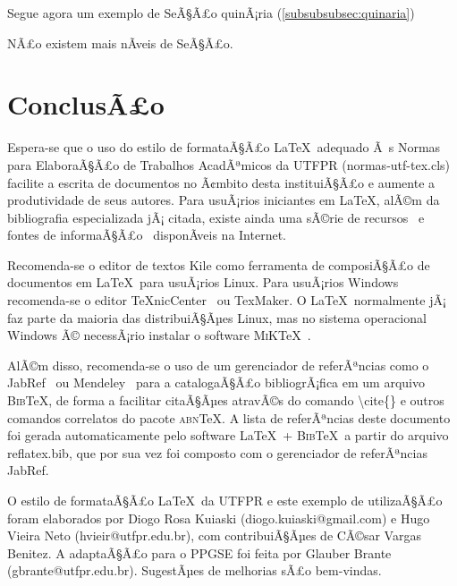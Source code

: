 \documentclass[openright]{normas-utf-tex} %
\begin{document}
Segue agora um exemplo de SeÃ§Ã£o quinÃ¡ria (\ref{subsubsubsec:quinaria})

\label{subsubsubsec:quinaria}

NÃ£o existem mais nÃ­veis de SeÃ§Ã£o.

\chapter{ConclusÃ£o}
\label{chap:conclusao}

Espera-se que o uso do estilo de formataÃ§Ã£o \LaTeX\ adequado Ã s Normas para ElaboraÃ§Ã£o de Trabalhos AcadÃªmicos da UTFPR ({\ttfamily normas-utf-tex.cls}) facilite a escrita de documentos no Ã¢mbito desta instituiÃ§Ã£o e aumente a produtividade de seus autores. Para usuÃ¡rios iniciantes em \LaTeX, alÃ©m da bibliografia especializada jÃ¡ citada, existe ainda uma sÃ©rie de recursos~\cite{CTAN2009} e fontes de informaÃ§Ã£o~\cite{TeX-Br2009,Wikibooks2009} disponÃ­veis na Internet.

Recomenda-se o editor de textos Kile como ferramenta de composiÃ§Ã£o de documentos em \LaTeX\ para usuÃ¡rios Linux. Para usuÃ¡rios Windows recomenda-se o editor \TeX nicCenter~\cite{TeXnicCenter2009} ou TexMaker. O \LaTeX\ normalmente jÃ¡ faz parte da maioria das distribuiÃ§Ãµes Linux, mas no sistema operacional Windows Ã© necessÃ¡rio instalar o software \textsc{MiK}\TeX~\cite{MiKTeX2009}.

AlÃ©m disso, recomenda-se o uso de um gerenciador de referÃªncias como o JabRef~\cite{JabRef2009} ou Mendeley~\cite{Mendeley2009} para a catalogaÃ§Ã£o bibliogrÃ¡fica em um arquivo \textsc{Bib}\TeX, de forma a facilitar citaÃ§Ãµes atravÃ©s do comando {\ttfamily \textbackslash cite\{\}} e outros comandos correlatos do pacote \textsc{abn}\TeX. A lista de referÃªncias deste documento foi gerada automaticamente pelo software \LaTeX\ + \textsc{Bib}\TeX\ a partir do arquivo {\ttfamily reflatex.bib}, que por sua vez foi composto com o gerenciador de referÃªncias JabRef.

O estilo de formataÃ§Ã£o \LaTeX\ da UTFPR e este exemplo de utilizaÃ§Ã£o foram elaborados por Diogo Rosa Kuiaski (diogo.kuiaski@gmail.com) e Hugo Vieira Neto (hvieir@utfpr.edu.br), com contribuiÃ§Ãµes de CÃ©sar Vargas Benitez. A adaptaÃ§Ã£o para o PPGSE foi feita por Glauber Brante (gbrante@utfpr.edu.br). SugestÃµes de melhorias sÃ£o bem-vindas.



\clearpage %
\label{bibstart}
\label{bibend}
\end{document}
